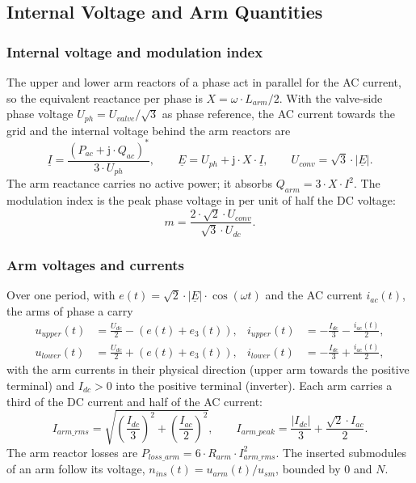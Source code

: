 \subsection{Internal Voltage and Arm Quantities}
\label{sec:converter-arm}

\subsubsection{Internal voltage and modulation index}

The upper and lower arm reactors of a phase act in parallel for the AC current, so the equivalent reactance per
phase is $X = \omega \cdot L_{arm} / 2$. With the valve-side phase voltage $U_{ph} = U_{valve} / \sqrt{3}$ as phase
reference, the AC current towards the grid and the internal voltage behind the arm reactors are
\begin{equation}
  \underline{I} = \frac{\left( P_{ac} + \mathrm{j} \cdot Q_{ac} \right)^{*}}{3 \cdot U_{ph}} , \qquad
  \underline{E} = U_{ph} + \mathrm{j} \cdot X \cdot \underline{I} , \qquad
  U_{conv} = \sqrt{3} \cdot |\underline{E}| .
\end{equation}
The arm reactance carries no active power; it absorbs $Q_{arm} = 3 \cdot X \cdot I^2$. The modulation index is the
peak phase voltage in per unit of half the DC voltage:
\begin{equation}
  m = \frac{2 \cdot \sqrt{2} \cdot U_{conv}}{\sqrt{3} \cdot U_{dc}} .
\end{equation}

\subsubsection{Arm voltages and currents}

Over one period, with $e(t) = \sqrt{2} \cdot |\underline{E}| \cdot \cos(\omega t)$ and the AC current $i_{ac}(t)$,
the arms of phase a carry
\begin{align}
  u_{upper}(t) &= \frac{U_{dc}}{2} - \left( e(t) + e_3(t) \right) , &
  i_{upper}(t) &= -\frac{I_{dc}}{3} - \frac{i_{ac}(t)}{2} , \\
  u_{lower}(t) &= \frac{U_{dc}}{2} + \left( e(t) + e_3(t) \right) , &
  i_{lower}(t) &= -\frac{I_{dc}}{3} + \frac{i_{ac}(t)}{2} ,
\end{align}
with the arm currents in their physical direction (upper arm towards the positive terminal) and $I_{dc} > 0$ into
the positive terminal (inverter). Each arm carries a third of the DC current and half of the AC current:
\begin{equation}
  I_{arm\_rms} = \sqrt{\left( \frac{I_{dc}}{3} \right)^2 + \left( \frac{I_{ac}}{2} \right)^2} , \qquad
  I_{arm\_peak} = \frac{|I_{dc}|}{3} + \frac{\sqrt{2} \cdot I_{ac}}{2} .
\end{equation}
The arm reactor losses are $P_{loss\_arm} = 6 \cdot R_{arm} \cdot I_{arm\_rms}^2$. The inserted submodules of an arm
follow its voltage, $n_{ins}(t) = u_{arm}(t) / u_{sm}$, bounded by 0 and $N$.

